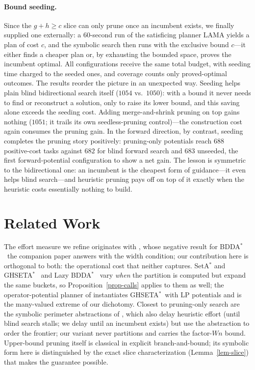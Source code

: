 \documentclass[letterpaper]{article}
\newcommand{\bddastar}{BDDA\ensuremath{^{*}}}
\newcommand{\ghseta}{GHSETA\ensuremath{^{*}}}
\theoremstyle{plain}
\theoremstyle{definition}
\theoremstyle{remark}
\begin{document}
\paragraph{Bound seeding.}
Since the $g + h \geq c$ slice can only prune once an incumbent exists,
we finally supplied one externally: a $60$-second run of the satisficing
planner \textsc{LAMA} yields a plan of cost $c$, and the symbolic search
then runs with the exclusive bound $c$---it either finds a cheaper plan
or, by exhausting the bounded space, proves the incumbent optimal. All
configurations receive the same total budget, with seeding time charged
to the seeded ones, and coverage counts only proved-optimal outcomes.
The results reorder the picture in an unexpected way. Seeding helps
plain blind bidirectional search itself ($1054$ vs.\ $1050$): with a
bound it never needs to find or reconstruct a solution, only to raise
its lower bound, and this saving alone exceeds the seeding cost. Adding
merge-and-shrink pruning on top gains nothing ($1051$; it trails its own
seedless-pruning control)---the construction cost again consumes the
pruning gain. In the forward direction, by contrast, seeding completes
the pruning story positively: pruning-only potentials reach $688$
positive-cost tasks against $682$ for blind forward search and $683$
unseeded, the first forward-potential configuration to show a net gain.
The lesson is symmetric to the bidirectional one: an incumbent is the
cheapest form of guidance---it even helps blind search---and heuristic
pruning pays off on top of it exactly when the heuristic costs
essentially nothing to build.


\section{Related Work}

The effort measure we refine originates with
\citet{speck-et-al-icaps2020}, whose negative result for \bddastar\ the
companion paper answers with the width condition; our contribution here
is orthogonal to both: the operational cost that neither captures.
SetA\ensuremath{^*} and \ghseta\ \citep{jensen-et-al-aij2008} and Lazy
\bddastar\ \citep{torralba-phd2015} vary \emph{when} the partition is
computed but expand the same buckets, so Proposition~\ref{prop-calls}
applies to them as well; the operator-potential planner of
\citet{fiser-et-al-aaai2022,fiser-et-al-aij2024} instantiates \ghseta\
with LP potentials and is the many-valued extreme of our dichotomy.
Closest to pruning-only search are the symbolic perimeter abstractions
of \citet{torralba-et-al-ijcai2016a,torralba-et-al-aij2018}, which also
delay heuristic effort (until blind search stalls; we delay until an
incumbent exists) but use the abstraction to order the frontier;
our variant never partitions and carries the factor-$Wn$ bound.
Upper-bound pruning itself is classical in explicit branch-and-bound;
its symbolic form here is distinguished by the exact slice
characterization (Lemma~\ref{lem-slice}) that makes the guarantee
possible.
\end{document}
